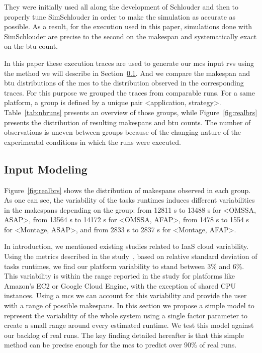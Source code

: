 \documentclass[]{llncs}
\begin{document}
They were  initially used  all along  the development of  Schlouder and  then to
properly  tune SimSchlouder  in  order to  make the  simulation  as accurate  as
possible.  As a result, for the execution  used in this paper, simulations done with
SimSchlouder are precise to the second  on the makespan and systematically exact
on the \ac{btu} count.

In this paper these execution traces are used to  generate our \ac{mcs} input
\acp{rv} using the method we will describe in Section~\ref{sec:im}. And we
compare the makespan  and \ac{btu}  distributions of the \ac{mcs} to the
distribution observed in the corresponding traces.
%
For this purpose we grouped the traces  from comparable runs.  For a same platform, 
a group is defined by a unique pair <application, strategy>.  
Table~\ref{tab:nbruns}  presents  an  overview   of  those groups,  while
Figure~\ref{fig:realbrs} presents the distribution of resulting makespans and \ac{btu} counts.
The number of observations is uneven between groups because of  the changing nature of
the    experimental   conditions    in   which    the   runs    were   executed.


\subsection{Input Modeling}\label{sec:im}

Figure~\ref{fig:realbrs} shows the distribution of makespans observed in each 
group. As one can see, the variability of the tasks runtimes induces different
variabilities in the makespans depending on the group:
from 12811 s to 13488 s for <OMSSA, ASAP>,
from 13564 s to 14172 s for <OMSSA, AFAP>,
from 1478 s to 1554 s for <Montage, ASAP>, and
from 2833 s to 2837 s for <Montage, AFAP>.


In introduction,
we mentioned existing studies related to IaaS cloud variability. Using the
metrics described in the study~\cite{LeitnerC16}, based on relative standard
deviation of tasks runtimes, we find our platform variability to stand between
3\% and 6\%. This variability is within the range reported in the study for
platforms like Amazon's EC2 or Google Cloud Engine, with the exception of shared
CPU instances.
Using a  \ac{mcs} we can account for this  variability and provide the
user with  a range of  possible makespans. In this  section we propose  a simple
model to  represent the variability of  the whole system using  a single factor
parameter to create  a small range around every estimated  runtime. We test this %
model against our backlog of real  runs.  The key finding detailed hereafter is
that this simple method  can be precise enough for the  \ac{mcs} to predict over
90\% of real runs.
\end{document}
